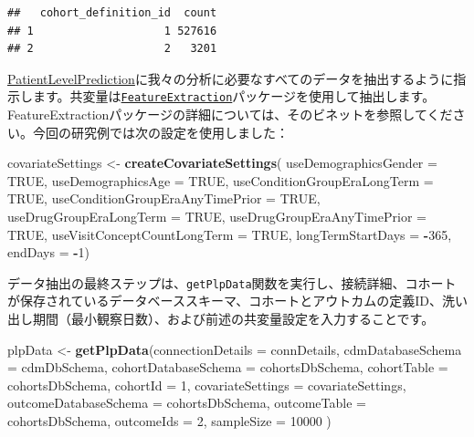 \documentclass[
  11pt]{book}
\newenvironment{Shaded}{\begin{snugshade}}{\end{snugshade}}
\newcommand{\AttributeTok}[1]{\textcolor[rgb]{0.13,0.29,0.53}{#1}}
\newcommand{\ConstantTok}[1]{\textcolor[rgb]{0.56,0.35,0.01}{#1}}
\newcommand{\DecValTok}[1]{\textcolor[rgb]{0.00,0.00,0.81}{#1}}
\newcommand{\FunctionTok}[1]{\textcolor[rgb]{0.13,0.29,0.53}{\textbf{#1}}}
\newcommand{\NormalTok}[1]{#1}
\newcommand{\OtherTok}[1]{\textcolor[rgb]{0.56,0.35,0.01}{#1}}
\newcommand{\SpecialCharTok}[1]{\textcolor[rgb]{0.81,0.36,0.00}{\textbf{#1}}}
\theoremstyle{definition}
\theoremstyle{definition}
\theoremstyle{definition}
\theoremstyle{definition}
\theoremstyle{remark}
\begin{document}
\begin{verbatim}
##   cohort_definition_id  count
## 1                    1 527616
## 2                    2   3201
\end{verbatim}

\href{https://ohdsi.github.io/PatientLevelPrediction/}{PatientLevelPrediction}に我々の分析に必要なすべてのデータを抽出するように指示します。共変量は\href{https://ohdsi.github.io/FeatureExtraction/}{\texttt{FeatureExtraction}}パッケージを使用して抽出します。FeatureExtractionパッケージの詳細については、そのビネットを参照してください。今回の研究例では次の設定を使用しました：

\begin{Shaded}
\begin{Highlighting}[]
\NormalTok{covariateSettings }\OtherTok{\textless{}{-}} \FunctionTok{createCovariateSettings}\NormalTok{(}
  \AttributeTok{useDemographicsGender =} \ConstantTok{TRUE}\NormalTok{,}
  \AttributeTok{useDemographicsAge =} \ConstantTok{TRUE}\NormalTok{,}
  \AttributeTok{useConditionGroupEraLongTerm =} \ConstantTok{TRUE}\NormalTok{,}
  \AttributeTok{useConditionGroupEraAnyTimePrior =} \ConstantTok{TRUE}\NormalTok{,}
  \AttributeTok{useDrugGroupEraLongTerm =} \ConstantTok{TRUE}\NormalTok{,}
  \AttributeTok{useDrugGroupEraAnyTimePrior =} \ConstantTok{TRUE}\NormalTok{,}
  \AttributeTok{useVisitConceptCountLongTerm =} \ConstantTok{TRUE}\NormalTok{,}
  \AttributeTok{longTermStartDays =} \SpecialCharTok{{-}}\DecValTok{365}\NormalTok{,}
  \AttributeTok{endDays =} \SpecialCharTok{{-}}\DecValTok{1}\NormalTok{)}
\end{Highlighting}
\end{Shaded}

データ抽出の最終ステップは、\texttt{getPlpData}関数を実行し、接続詳細、コホートが保存されているデータベーススキーマ、コホートとアウトカムの定義ID、洗い出し期間（最小観察日数）、および前述の共変量設定を入力することです。

\begin{Shaded}
\begin{Highlighting}[]
\NormalTok{plpData }\OtherTok{\textless{}{-}} \FunctionTok{getPlpData}\NormalTok{(}\AttributeTok{connectionDetails =}\NormalTok{ connDetails,}
                      \AttributeTok{cdmDatabaseSchema =}\NormalTok{ cdmDbSchema,}
                      \AttributeTok{cohortDatabaseSchema =}\NormalTok{ cohortsDbSchema,}
                      \AttributeTok{cohortTable =}\NormalTok{ cohortsDbSchema,}
                      \AttributeTok{cohortId =} \DecValTok{1}\NormalTok{,}
                      \AttributeTok{covariateSettings =}\NormalTok{ covariateSettings,}
                      \AttributeTok{outcomeDatabaseSchema =}\NormalTok{ cohortsDbSchema,}
                      \AttributeTok{outcomeTable =}\NormalTok{ cohortsDbSchema,}
                      \AttributeTok{outcomeIds =} \DecValTok{2}\NormalTok{,}
                      \AttributeTok{sampleSize =} \DecValTok{10000}
\NormalTok{)}
\end{Highlighting}
\end{Shaded}
\end{document}
